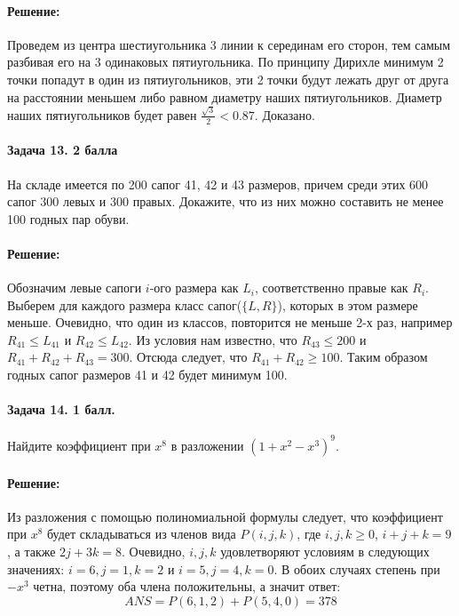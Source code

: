 \documentclass[12pt]{article}
\begin{document}
\paragraph{\bf Решение:}
Проведем из центра шестиугольника 3 линии к серединам его сторон, тем самым разбивая его на
3 одинаковых пятиугольника. По принципу Дирихле минимум 2 точки попадут в один из пятиугольников,
эти 2 точки будут лежать друг от друга на расстоянии меньшем либо равном диаметру наших пятиугольников.
Диаметр наших пятиугольников будет равен $\frac{\sqrt{3}}{2} < 0.87$. Доказано.

\paragraph{Задача 13. 2 балла} На складе имеется по 200 сапог 41, 42 и 43 размеров, 
причем среди этих 600 сапог 300 левых и 300 правых. Докажите, что из них 
можно составить не менее 100 годных пар обуви. 

\paragraph{\bf Решение:}
Обозначим левые сапоги $i$-ого размера как $L_i$, соответственно правые как $R_i$.
Выберем для каждого размера класс сапог($\{L,R\}$), которых в этом размере меньше.
Очевидно, что один из классов, повторится не меньше 2-х раз, например
$ R_{41} \le L_{41} $ и $ R_{42} \le L_{42} $. Из условия нам известно, что $ R_{43} \le 200 $ и 
$ R_{41} + R_{42} + R_{43} = 300 $. Отсюда следует, что $ R_{41} + R_{42} \ge 100 $. Таким образом
годных сапог размеров 41 и 42 будет минимум 100.

\paragraph{Задача 14. 1 балл.} Найдите коэффициент при $ x^8 $ в разложении 
$ (1+x^2-x^3)^9 $. 

\paragraph{\bf Решение:}
Из разложения с помощью полиномиальной формулы следует, что коэффициент при $ x^8 $ будет складываться из членов вида
$ P(i, j, k) $, где $ i,j,k \ge 0$, $i + j + k = 9 $, а также $ 2j + 3k = 8 $. Очевидно, $ i, j, k $ удовлетворяют
условиям в следующих значениях: $i = 6, j = 1, k = 2 $ и $i = 5, j = 4, k = 0$. В обоих случаях степень при
$-x^3$ четна, поэтому оба члена положительны, а значит ответ:
$$ ANS = P(6, 1, 2) + P(5, 4, 0) = 378 $$
\end{document}
